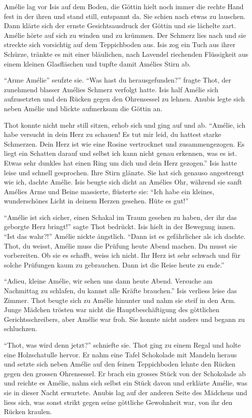 \documentclass[11pt,titlepage,a5paper]{book}
\begin{document}
Amélie lag vor Isis auf dem Boden, die Göttin hielt noch immer die rechte Hand fest in der ihren und stand still, entspannt da. Sie schien nach etwas zu lauschen. Dann klärte sich der ernste Gesichtsausdruck der Göttin und sie lächelte zart. Amélie hörte auf sich zu winden und zu krümmen. Der Schmerz lies nach und sie streckte sich vorsichtig auf dem Teppichboden aus. Isis zog ein Tuch aus ihrer Schürze, tränkte es mit einer bläulichen, nach Lavendel riechenden Flüssigkeit aus einem kleinen Glasfläschen und tupfte damit Amélies Stirn ab.

"`Arme Amélie"' seufzte sie. "`Was hast du herausgefunden?"' fragte Thot, der zunehmend blasser Amélies Schmerz verfolgt hatte. Isis half Amélie sich aufzusetzten und den Rücken gegen den Ohrensessel zu lehnen. Anubis legte sich neben Amélie und blickte aufmerksam die Göttin an. 

Thot konnte nicht mehr still sitzen, erhob sich und ging auf und ab. "`Amélie, ich habe versucht in dein Herz zu schauen! Es tut mir leid, du hattest starke Schmerzen. Dein Herz ist wie eine Rosine vertrocknet und zusammengezogen. Es liegt ein Schatten darauf und selbst ich kann nicht genau erkennen, was es ist. Etwas sehr dunkles hat einen Ring um dich und dein Herz gezogen."' Isis hatte leise und schnell gesprochen. Ihre Stirn glänzte. Sie hat sich genauso angestrengt wie ich, dachte Amélie. Isis beugte sich dicht an Amélies Ohr, während sie sanft Amélies Arme und Beine massierte, flüsterte sie: "`Ich habe ein kleines, wunderschönes Licht in deinem Herzen gesehen. Hüte es gut!"'

"`Amélie ist sich sicher, einen Schakal im Traum gesehen zu haben, der ihr das geborgte Herz bringt!"' sagte Thot bedrückt. Isis hielt in der Bewegung innen. "`Ist das wahr?!"' Amélie nickte ängstlich. "`Dann ist es gefährlicher als ich dachte. Thot, du weisst, Amélie muss die Prüfung heute Abend machen. Du musst sie vorbereiten. Ob sie es schafft, weiss ich nicht. Ihr Herz ist sehr schwach und für solche Prüfungen kaum zu gebrauchen. Dann ist die Reise heute zu ende."'

"`Adieu, kleine Amélie, wir sehen uns dann heute Abend. Versuche am Nachmittag zu schlafen, du kannst alle Kräfte brauchen."' Isis verliess leise das Zimmer. Thot beugte sich zu Amélie hinunter und nahm sie steif in den Arm. Junge Mädchen trösten war nicht die Hauptbeschäftigung des göttlichen Gerichtsschreibers, aber Amélie war froh. Sie konnte nicht anders und begann zu schluchzen.

"`Thot, was wird denn jetzt?"' schniefte sie. Thot ging zu einem Regal und holte eine Holzschatulle hervor. Er nahm eine Tafel Schokolade mit Mandeln heraus und setzte sich neben Amélie auf den feinen Teppichboden lehnte den Rücken gegen den grossen Ohrensessel. Er brach ein grosses Stück von der Schokolade ab und reichte es Amélie, nahm sich selbst ein Stück davon und erklärte Amélie, was sie in dieser Nacht erwartete. Anubis lag auf der anderen Seite des Mädchens und liess sich, was sonst strikt gegen seine göttliche Gewohnheit war, von ihr den Rücken kraulen.
\end{document}
